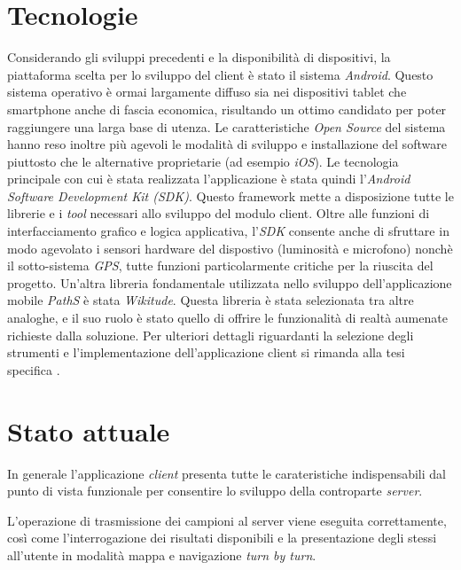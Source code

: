 \section{Tecnologie}
Considerando gli sviluppi precedenti e la disponibilità di dispositivi, la piattaforma scelta per lo sviluppo del client è stato il sistema \emph{Android}. Questo sistema operativo è ormai largamente diffuso sia nei dispositivi tablet che smartphone anche di fascia economica, risultando un ottimo candidato per poter raggiungere una larga base di utenza. Le caratteristiche \emph{Open Source} del sistema hanno reso inoltre più agevoli le modalità di sviluppo e installazione del software piuttosto che le alternative proprietarie (ad esempio \emph{iOS}).
Le tecnologia principale con cui è stata realizzata l'applicazione è stata quindi l'\emph{Android Software Development Kit (SDK)}. Questo framework mette a disposizione tutte le librerie e i \emph{tool} necessari allo sviluppo del modulo client. Oltre alle funzioni di interfacciamento grafico e logica applicativa, l'\emph{SDK} consente anche di sfruttare in modo agevolato i sensori hardware del dispostivo (luminosità e microfono) nonchè il sotto-sistema \emph{GPS}, tutte funzioni particolarmente critiche per la riuscita del progetto.
Un'altra libreria fondamentale utilizzata nello sviluppo dell'applicazione mobile \emph{PathS} è stata \emph{Wikitude}. Questa libreria è stata selezionata tra altre analoghe, e il suo ruolo è stato quello di offrire le funzionalità di realtà aumenate richieste dalla soluzione. 
Per ulteriori dettagli riguardanti la selezione degli strumenti e l'implementazione dell'applicazione client si rimanda alla tesi specifica \cite{tesitombolini}.

\section{Stato attuale}
In generale l'applicazione \emph{client} presenta tutte le carateristiche indispensabili dal punto di vista funzionale per consentire lo sviluppo della controparte \emph{server}.

L'operazione di trasmissione dei campioni al server viene eseguita correttamente, così come l'interrogazione dei risultati disponibili e la presentazione degli stessi all'utente in modalità mappa e navigazione \emph{turn by turn}.

